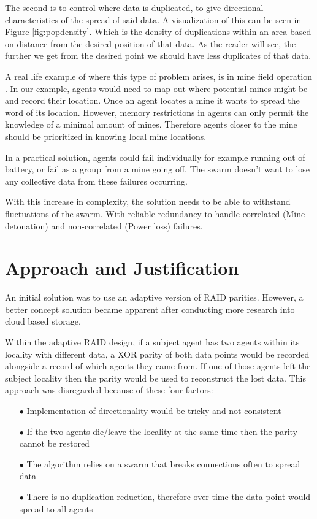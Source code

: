 \documentclass{UoYCSproject}
\begin{document}
The second is to control where data is duplicated, to give directional characteristics of the spread of said data.
A visualization of this can be seen in Figure \ref{fig:popdensity}. Which is the density of duplications within an area based on distance from the desired position of that data.
As the reader will see, the further we get from the desired point we should have less duplicates of that data.

A real life example of where this type of problem arises, is in mine field operation \cite{Cognitive maps mine detection}.
In our example, agents would need to map out where potential mines might be and record their location.
Once an agent locates a mine it wants to spread the word of its location.
However, memory restrictions in agents can only permit the knowledge of a minimal amount of mines. Therefore agents closer to the mine should be prioritized in knowing local mine locations.

In a practical solution, agents could fail individually for example running out of battery, or fail as a group from a mine going off.
The swarm doesn't want to lose any collective data from these failures occurring.

With this increase in complexity, the solution needs to be able to withstand fluctuations of the swarm.
With reliable redundancy to handle correlated (Mine detonation) and non-correlated (Power loss) failures.


\section{Approach and Justification}
\label{sec:Inital Soloution Ideas}

An initial solution was to use an adaptive version of RAID parities. However, a better concept solution became apparent after conducting more research into cloud based storage.

Within the adaptive RAID design, if a subject agent has two agents within its locality with different data, a XOR parity of both data points would be recorded alongside a record of which agents they came from. If one of those agents left the subject locality then the parity would be used to reconstruct the lost data. This approach was disregarded because of these four factors:

\begin{itemize}
\itemsep-1em
\item[$\bullet$] Implementation of directionality would be tricky and not consistent
\item[$\bullet$] If the two agents die/leave the locality at the same time then the parity cannot be restored
\item[$\bullet$] The algorithm relies on a swarm that breaks connections often to spread data
\item[$\bullet$] There is no duplication reduction, therefore over time the data point would spread to all agents
\end{itemize}
\end{document}
